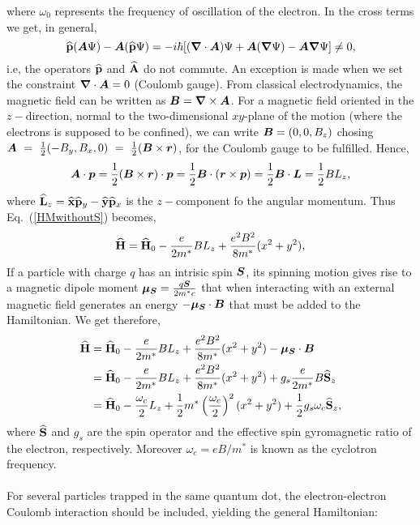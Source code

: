 where $\omega_0$ represents the frequency of oscillation of the electron. In the cross terms we get, in general, 
$${\bf\widehat{p}}(\boldsymbol{A}\Psi)-\boldsymbol{A}({\bf\widehat{p}}\Psi)=-i\hbar[(\boldsymbol{\nabla} \cdot\boldsymbol{A})\Psi + \boldsymbol{A} (\boldsymbol{\nabla} \Psi) - \boldsymbol{A} \boldsymbol{\nabla} \Psi] \neq 0,$$ 
i.e, the operators ${\bf\widehat{p}}$ and ${\bf\widehat{A}}$ do not commute. An exception is made when we set the constraint $\boldsymbol{\nabla}\cdot \boldsymbol{A} = 0$ (Coulomb gauge). From classical electrodynamics, the magnetic field can be written as $\boldsymbol{B} = \boldsymbol{\nabla} \times \boldsymbol{A}$. For a magnetic field oriented in the $z-$direction, normal to the two-dimensional $xy$-plane of the motion (where the electrons is supposed to be confined), we can write $\boldsymbol{B}=(0,0,B_z)$ chosing $\boldsymbol{A}~=~\frac{1}{2}(-B_y, B_x, 0)~=~\frac{1}{2}(\boldsymbol{B}\times\boldsymbol{r})$, for the Coulomb gauge to be fulfilled. Hence, 
\begin{equation*}
 \boldsymbol{A}\cdot\boldsymbol{p} = \frac{1}{2}(\boldsymbol{B}\times\boldsymbol{r})\cdot\boldsymbol{p} = \frac{1}{2}\boldsymbol{B}\cdot(\boldsymbol{r}\times\boldsymbol{p}) = \frac{1}{2}\boldsymbol{B}\cdot\boldsymbol{L} = \frac{1}{2}B L_z,
\end{equation*}
where ${\bf\widehat{L}}_z = {\bf\widehat{x}}{\bf\widehat{p}}_y - {\bf\widehat{y}}{\bf\widehat{p}}_x$ is the $z-$component fo the angular momentum. Thus Eq.~(\ref{HMwithoutS}) becomes,
$$
{\bf\widehat{H}} =  {\bf\widehat{H}}_0 - \frac{e}{2m^*}BL_z + \frac{e^2 B^2}{8 m^*}(x^2 + y^2),
$$
If a particle with charge $q$ has an intrisic spin $\boldsymbol{S}$, its spinning motion gives rise to a magnetic dipole moment $\boldsymbol{\mu_S} = \frac{q\boldsymbol{S}}{2m^* c}$ that when interacting with an external magnetic field generates an energy $-\boldsymbol{\mu_S}\cdot \boldsymbol{B}$ that must be added to the Hamiltonian\cite{Zettili2001}. We get therefore,
\begin{align*}
{\bf\widehat{H}} & =  {\bf\widehat{H}}_0 - \frac{e}{2m^*}BL_z + \frac{e^2 B^2}{8 m^*}(x^2 + y^2) - \boldsymbol{\mu_S}\cdot \boldsymbol{B}\\
       & =  {\bf\widehat{H}}_0 - \frac{e}{2m^*}BL_z + \frac{e^2 B^2}{8 m^*}(x^2 + y^2) + g_s \frac{e}{2 m^*}B {\bf\widehat{S}}_z\\
			  & =  {\bf\widehat{H}}_0 - \frac{\omega_c}{2} L_z + \frac{1}{2} m^* \left(\frac{\omega_c}{2}\right)^2 (x^2 + y^2) + \frac{1}{2}g_s \omega_c {\bf\widehat{S}}_z,
\end{align*}
where ${\bf\widehat{S}}$ and $g_s$ are the spin operator and the effective spin gyromagnetic ratio of the electron, respectively. Moreover $\omega_c = eB/m^*$ is known as the cyclotron frequency.\\
\\
For several particles trapped in the same quantum dot, the electron-electron Coulomb interaction should be included, yielding the general Hamiltonian:
